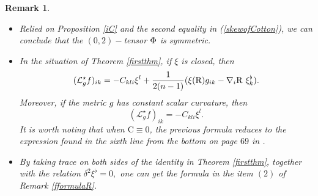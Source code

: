 \documentclass[10pt,leqno,oneside]{amsart}
\newtheorem{Rmk}{Remark}
\begin{document}
{    \begin{Rmk}\label{closedmathcalLf}
          \begin{itemize}[leftmargin=0.5cm, itemindent=0.4cm]
            \item[{\rm(1)}.] Relied on Proposition {\rm\ref{iC}} and the second equality in {\rm(\ref{skewofCotton})}, we can conclude that the $(0,2)-$tensor ${\rm\Phi}$ is symmetric.%
            \item[{\rm(2)}.] In the situation of Theorem {\rm\ref{firstthm}}, if $\xi$ is closed, then
       \[(\mathcal{L}_g^{\star}f)_{ik}=-C_{kli}\xi^l+\frac{1}{2(n-1)}(\xi({\rm{R}})g_{ik}-\nabla_i{\rm{R}} ~\xi_k^{\flat}).\]
         Moreover, if the metric $g$ has constant scalar curvature, then
          $$(\mathcal{L}_g^{\star}f)_{ik}=-C_{kli}\xi^l.$$
         It is worth noting that when \(\mathrm{C}\equiv 0\), the previous formula reduces to the expression found in the sixth line from the bottom on page $69$ in {\rm\cite{Lafontaine1983}}.
            \item[{\rm(3)}.] By taking trace on both sides of the identity in Theorem {\rm\ref{firstthm}}, together with the relation $\delta^2\xi^\flat=0,$ one can get the formula in the item $(2)$ of Remark {\rm\ref{fformulaR}}.
          \end{itemize}
    \end{Rmk}
}
\end{document}
